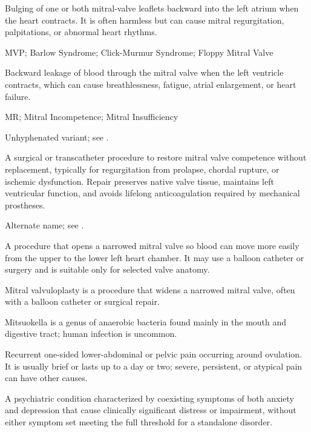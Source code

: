  Bulging of one or both mitral-valve leaflets backward into the left atrium when the heart contracts. It is often harmless but can cause mitral regurgitation, palpitations, or abnormal heart rhythms.

\synonyms
MVP; Barlow Syndrome; Click-Murmur Syndrome; Floppy Mitral Valve

 Backward leakage of blood through the mitral valve when the left ventricle contracts, which can cause breathlessness, fatigue, atrial enlargement, or heart failure.

\synonyms
MR; Mitral Incompetence; Mitral Insufficiency

 Unhyphenated variant; see .

 A surgical or transcatheter procedure to restore mitral valve competence without
replacement, typically for regurgitation from prolapse, chordal rupture, or ischemic
dysfunction. Repair preserves native valve tissue, maintains left ventricular function,
and avoids lifelong anticoagulation required by mechanical prostheses.

 Alternate name; see .

 A procedure that opens a narrowed mitral valve so blood can move more easily from the upper to the lower left heart chamber. It may use a balloon catheter or surgery and is suitable only for selected valve anatomy.

 Mitral valvuloplasty is a procedure that widens a narrowed mitral valve, often with a balloon catheter or surgical repair.

 Mitsuokella is a genus of anaerobic bacteria found mainly in the mouth and digestive tract; human infection is uncommon.

 Recurrent one-sided lower-abdominal or pelvic pain occurring around ovulation. It is usually brief or lasts up to a day or two; severe, persistent, or atypical pain can have other causes.

 A psychiatric condition characterized by coexisting symptoms of both anxiety and depression that cause clinically significant distress or impairment, without either symptom set meeting the full threshold for a standalone disorder.

